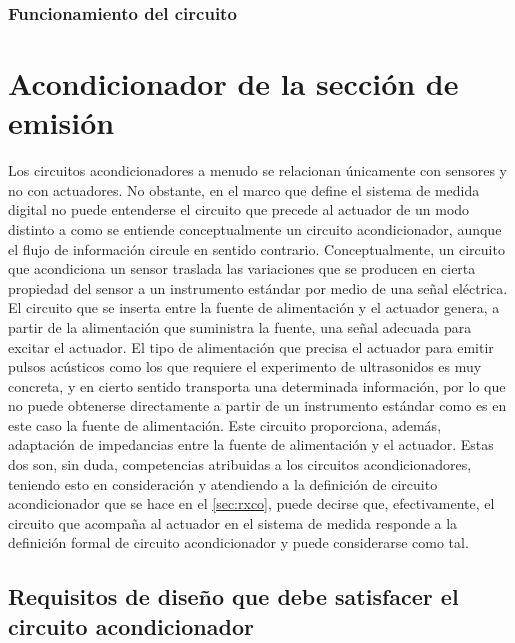 

\subsubsection{Funcionamiento del circuito}


\section{Acondicionador de la sección de emisión}

Los circuitos acondicionadores a menudo se relacionan únicamente con
sensores y no con actuadores. No obstante, en el marco que define el
sistema de medida digital no puede entenderse el circuito que precede al
actuador de un modo distinto a como se entiende conceptualmente un circuito
acondicionador, aunque el flujo de información circule en sentido
contrario. Conceptualmente, un circuito que acondiciona un sensor traslada
las variaciones que se producen en cierta propiedad del sensor a un
instrumento estándar por medio de una señal eléctrica. El circuito que se
inserta entre la fuente de alimentación y el actuador genera, a partir de
la alimentación que suministra la fuente, una señal adecuada para excitar
el actuador. El tipo de alimentación que precisa el actuador para emitir
pulsos acústicos como los que requiere el experimento de ultrasonidos es
muy concreta, y en cierto sentido transporta una determinada información,
por lo que no puede obtenerse directamente a partir de un instrumento
estándar como es en este caso la fuente de alimentación. Este circuito
proporciona, además, adaptación de impedancias entre la fuente de
alimentación y el actuador. Estas dos son, sin duda, competencias
atribuidas a los circuitos acondicionadores, teniendo esto en consideración
y atendiendo a la definición de circuito acondicionador que se hace en el
\cref{sec:rxco}, puede decirse que, efectivamente, el circuito que acompaña
al actuador en el sistema de medida responde a la definición formal de
circuito acondicionador y puede considerarse como tal.


\subsection[Requisitos de diseño del acondicionador]{Requisitos de diseño
que debe satisfacer el circuito acondicionador}

